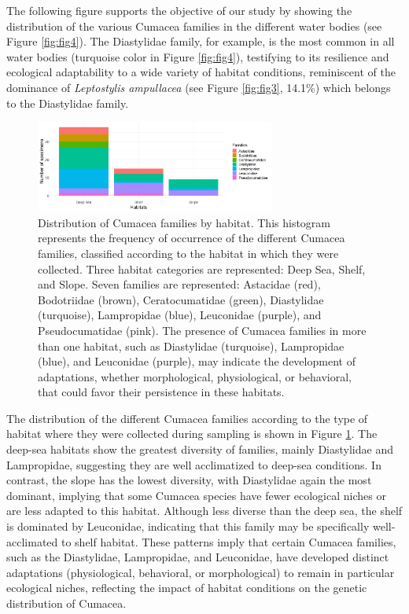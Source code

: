 {The following figure supports the objective of our study by showing the distribution of the various Cumacea families in the different water bodies (see Figure \ref{fig:fig4}). The Diastylidae family, for example, is the most common in all water bodies (turquoise color in Figure \ref{fig:fig4}), testifying to its resilience and ecological adaptability to a wide variety of habitat conditions, reminiscent of the dominance of \emph{Leptostylis ampullacea} (see Figure \ref{fig:fig3}, 14.1\%) which belongs to the Diastylidae family.

\begin{figure}[]
    \centering
    \includegraphics[width=0.7\textwidth]{figure4.png}
    \caption{Distribution of Cumacea families by habitat. This histogram represents the frequency of occurrence of the different Cumacea families, classified according to the habitat in which they were collected. Three habitat categories are represented: Deep Sea, Shelf, and Slope. Seven families are represented: Astacidae (red), Bodotriidae (brown), Ceratocumatidae (green), Diastylidae (turquoise), Lampropidae (blue), Leuconidae (purple), and Pseudocumatidae (pink). The presence of Cumacea families in more than one habitat, such as Diastylidae (turquoise), Lampropidae (blue), and Leuconidae (purple), may indicate the development of adaptations, whether morphological, physiological, or behavioral, that could favor their persistence in these habitats. \label{fig:fig5}}
\end{figure}

The distribution of the different Cumacea families according to the type of habitat where they were collected during sampling is shown in Figure \ref{fig:fig5}. The deep-sea habitats show the greatest diversity of families, mainly Diastylidae and Lampropidae, suggesting they are well acclimatized to deep-sea conditions. In contrast, the slope has the lowest diversity, with Diastylidae again the most dominant, implying that some Cumacea species have fewer ecological niches or are less adapted to this habitat. Although less diverse than the deep sea, the shelf is dominated by Leuconidae, indicating that this family may be specifically well-acclimated to shelf habitat. These patterns imply that certain Cumacea families, such as the Diastylidae, Lampropidae, and Leuconidae, have developed distinct adaptations (physiological, behavioral, or morphological) to remain in particular ecological niches, reflecting the impact of habitat conditions on the genetic distribution of Cumacea.

}
